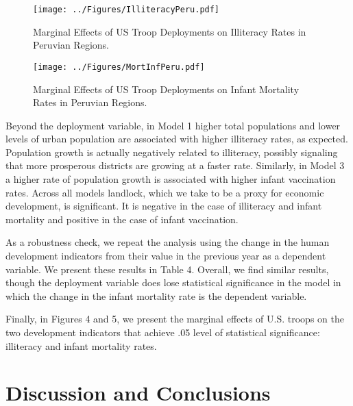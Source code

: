 \documentclass[12pt]{article}
\begin{document}
\begin{doublespace}
\begin{figure}[t]
\begin{center}
\texttt{[image: ../Figures/IlliteracyPeru.pdf]}
\caption{Marginal Effects of US Troop Deployments on Illiteracy Rates in Peruvian Regions.}
\label{fig:scatterplot}
\end{center}
\end{figure}

\begin{figure}[t]
\begin{center}
\texttt{[image: ../Figures/MortInfPeru.pdf]}
\caption{Marginal Effects of US Troop Deployments on Infant Mortality Rates in Peruvian Regions.}
\label{fig:scatterplot}
\end{center}
\end{figure}

Beyond the deployment variable, in Model 1 higher total populations and lower levels of urban population are associated with higher illiteracy rates, as expected.  Population growth is actually negatively related to illiteracy, possibly signaling that more prosperous districts are growing at a faster rate.  Similarly, in Model 3 a higher rate of population growth is associated with higher infant vaccination rates.  Across all models landlock, which we take to be a proxy for economic development, is significant. It is negative in the case of illiteracy and infant mortality and positive in the case of infant vaccination.  

As a robustness check, we repeat the analysis using the change in the human development indicators from their value in the previous year as a dependent variable.  We present these results in Table 4.  Overall, we find similar results, though the deployment variable does lose statistical significance in the model in which the change in the infant mortality rate is the dependent variable.

Finally, in Figures 4 and 5, we present the marginal effects of U.S. troops on the two development indicators that achieve  .05 level of statistical significance: illiteracy and infant mortality rates.





\section{Discussion and Conclusions}




\end{doublespace}
\end{document}
